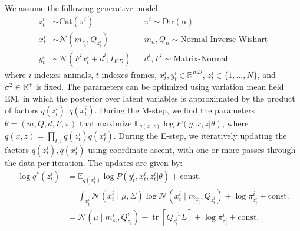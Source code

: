 \documentclass{article}         %
\DeclareMathOperator{\tr}{tr}
\begin{document}
We assume the following generative model:
\begin{align}
    z_t^i & \sim \text{Cat}(\pi^i) && 
    \pi^i \sim \text{Dir}(\alpha) \\
    x_t^i & \sim \mathcal{N}(m_{z_t^i}, Q_{z_t^i}) &&
    m_n, Q_n \sim \text{Normal-Inverse-Wishart} \\
    y_t^i & \sim \mathcal{N}(F^i x_t^i + d^i, I_{KD}) && 
    d^i, F^i \sim \text{Matrix-Normal}   
\end{align}
%
where $i$ indexes animals, $t$ indexes frames, $x_t^i, y_t^i \in \mathbb{R}^{KD}$, $z_t^i \in \{1,...,N\}$, and $\sigma^2 \in \mathbb{R}^+$ is fixed. The parameters can be optimized using variation mean field EM, in which the posterior over latent variables is approximated by the product of factors $q(z_t^i), q(x_t^i)$. During the M-step, we find the parameters $\theta = (m, Q, d, F, \pi)$  that maximize $\mathbb{E}_{q(x,z)} \log P(y,x,z | \theta)$, where $q(x,z) = \prod_{t,i} q(z_t^i) q(x_t^i)$. During the E-step, we iteratively updating the factors $q(z_t^i), q(x_t^i)$ using coordinate ascent, with one or more passes through the data per iteration. The updates are given by:
\begin{align}
\log q^*(z_t^i) & = \mathbb{E}_{q(x_t^i)} \log P(y_t^i, x_t^i, z_t^i | \theta) + \text{const.} \\
& = \int_{x_t^i} \mathcal{N}(x_t^i \mid \mu, \Sigma) \log \mathcal{N}(x_t^i \mid m_{z_t^i}, Q_{z_t^i}) + \log \pi^i_{z_t^i} + \text{const.} \\
& = \mathcal{N}(\mu \mid m_{z_t}^i, Q_{z_t}^i) - \tr [Q_{z_t^i}^{-1}\Sigma] + \log \pi^i_{z_t^i} + \text{const.}
\end{align}
\end{document}
